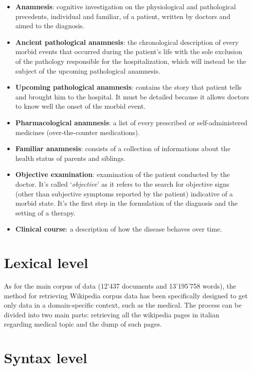 \begin{itemize}
	\item \textbf{Anamnesis}: cognitive investigation on the physiological and pathological precedents, individual and familiar, of a patient, written by doctors and aimed to the diagnosis. 
	\item \textbf{Ancient pathological anamnesis}: the chronological description of every morbid events that occurred during the patient's life with the sole exclusion of the pathology responsible for the hospitalization, which will instead be the subject of the upcoming pathological anamnesis. 
	\item \textbf{Upcoming pathological anamnesis}: contains the story that patient tells and brought him to the hospital. It must be detailed because it allows doctors to know well the onset of the morbid event.
	\item \textbf{Pharmacological anamnesis}: a list of every prescribed or self-administered medicines (over-the-counter medications).
	\item \textbf{Familiar anamnesis}: consists of a collection of informations about the health status of parents and siblings.
	\item \textbf{Objective examination}: examination of the patient conducted by the doctor. It's called \enquote*{\textit{objective}} as it refers to the search for objective signs (other than subjective symptoms reported by the patient) indicative of a morbid state. It's the first step in the formulation of the diagnosis and the setting of a therapy.
	\item \textbf{Clinical course}: a description of how the disease behaves over time.
\end{itemize}

\section{Lexical level}

As for the main corpus of data (12'437 documents and 13'195'758 words), the method for retrieving Wikipedia corpus data has been specifically designed to get only data in a domain-specific context, such as the medical.
The process can be divided into two main parts: retrieving all the wikipedia pages in italian regarding medical topic and the dump of such pages.

\section{Syntax level}

